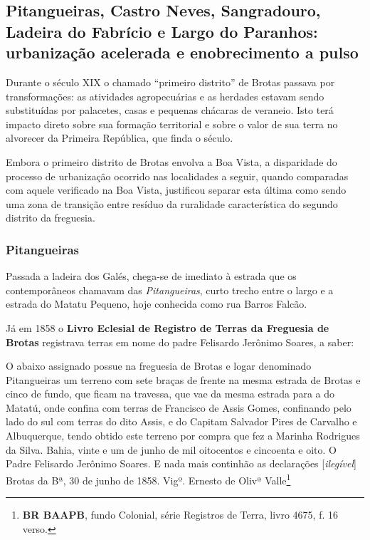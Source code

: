 \subsection{Pitangueiras, Castro Neves, Sangradouro, Ladeira do Fabrício e Largo do Paranhos: urbanização acelerada e enobrecimento a pulso}\label{subsec:pitangueiras}

Durante o século XIX o chamado ``primeiro distrito'' de Brotas passava por transformações: as atividades agropecuárias e as herdades estavam sendo substituídas por palacetes, casas e pequenas chácaras de veraneio. Isto terá impacto direto sobre sua formação territorial e sobre o valor de sua terra no alvorecer da Primeira República, que finda o século. 

Embora o primeiro distrito de Brotas envolva a Boa Vista, a disparidade do processo de urbanização ocorrido nas localidades a seguir, quando comparadas com aquele verificado na Boa Vista, justificou separar esta última como sendo uma zona de transição entre  resíduo da ruralidade característica do segundo distrito da freguesia.

\subsubsection{Pitangueiras}\label{subsubsec:pitangueiras}

Passada a ladeira dos Galés, chega-se de imediato à estrada que os contemporâneos chamavam das \textit{Pitangueiras}, curto trecho entre o largo e a estrada do Matatu Pequeno, hoje conhecida como rua Barros Falcão. 

Já em 1858 o \textbf{Livro Eclesial de Registro de Terras da Freguesia de Brotas} registrava terras em nome do padre Felisardo Jerônimo Soares, a saber:

\begin{citacao}
O abaixo assignado possue na freguesia de Brotas e logar denominado Pitangueiras um terreno com sete braças de frente na mesma estrada de Brotas e cinco de fundo, que ficam na travessa, que vae da mesma estrada para a do Matatú, onde confina com terras de Francisco de Assis Gomes, confinando pelo lado do sul com terras do dito Assis, e do Capitam Salvador Pires de Carvalho e Albuquerque, tendo obtido este terreno por compra que fez a Marinha Rodrigues da Silva. Bahia, vinte e um de junho de mil oitocentos e cincoenta e oito. O Padre Felisardo Jerônimo Soares. E nada mais continhão as declarações [\textit{ilegível}] Brotas da Bª, 30 de junho de 1858. 
Vigº. Ernesto de Olivª Valle\footnote{\textbf{BR BAAPB}, fundo Colonial, série Registros de Terra, livro 4675, f. 16 verso.}
\end{citacao}

